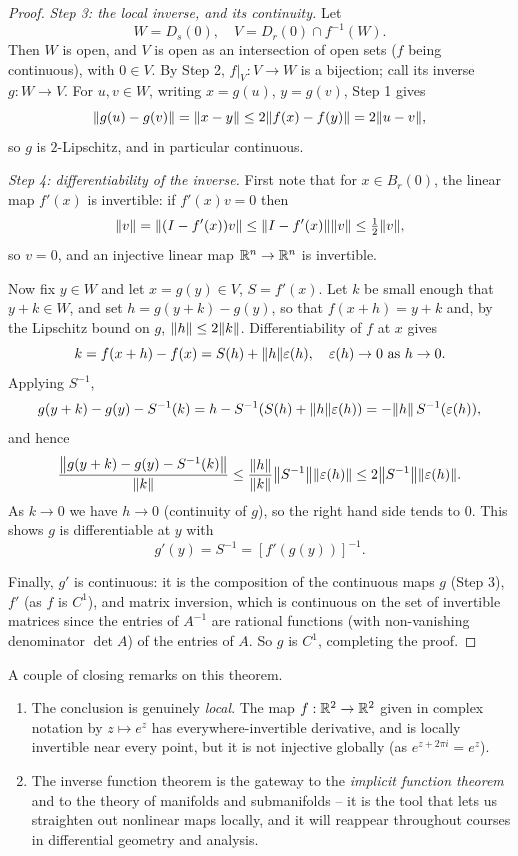 \documentclass[a4paper]{scrartcl}
\begin{document}
\begin{proof}
    \emph{Step 3: the local inverse, and its continuity.} Let
    $$
    W = D_s(0), \quad V = D_r(0) \cap f^{-1}(W).
    $$
    Then $W$ is open, and $V$ is open as an intersection of open sets ($f$ being continuous), with $0 \in V$. By Step 2, $f|_V: V \rightarrow W$ is a bijection; call its inverse $g: W \rightarrow V$. For $u, v \in W$, writing $x = g(u)$, $y = g(v)$, Step 1 gives
    $$
    \norm{g(u) - g(v)} = \norm{x - y} \leq 2\norm{f(x) - f(y)} = 2\norm{u - v},
    $$
    so $g$ is $2$-Lipschitz, and in particular continuous.

    \emph{Step 4: differentiability of the inverse.} First note that for $x \in B_r(0)$, the linear map $f'(x)$ is invertible: if $f'(x)v = 0$ then
    $$
    \norm{v} = \norm{(I - f'(x))v} \leq \norm{I - f'(x)}\norm{v} \leq \tfrac{1}{2}\norm{v},
    $$
    so $v = 0$, and an injective linear map $\mathbb{R}^n \rightarrow \mathbb{R}^n$ is invertible.

    Now fix $y \in W$ and let $x = g(y) \in V$, $S = f'(x)$. Let $k$ be small enough that $y + k \in W$, and set $h = g(y + k) - g(y)$, so that $f(x + h) = y + k$ and, by the Lipschitz bound on $g$, $\norm{h} \leq 2\norm{k}$. Differentiability of $f$ at $x$ gives
    $$
    k = f(x + h) - f(x) = S(h) + \norm{h}\varepsilon(h), \quad \varepsilon(h) \rightarrow 0 \text{ as } h \rightarrow 0.
    $$
    Applying $S^{-1}$,
    $$
    g(y + k) - g(y) - S^{-1}(k) = h - S^{-1}(S(h) + \norm{h}\varepsilon(h)) = -\norm{h}\, S^{-1}(\varepsilon(h)),
    $$
    and hence
    $$
    \frac{\norm{g(y + k) - g(y) - S^{-1}(k)}}{\norm{k}} \leq \frac{\norm{h}}{\norm{k}}\norm{S^{-1}}\norm{\varepsilon(h)} \leq 2\norm{S^{-1}}\norm{\varepsilon(h)}.
    $$
    As $k \rightarrow 0$ we have $h \rightarrow 0$ (continuity of $g$), so the right hand side tends to $0$. This shows $g$ is differentiable at $y$ with
    $$
    g'(y) = S^{-1} = \left[f'(g(y))\right]^{-1}.
    $$

    Finally, $g'$ is continuous: it is the composition of the continuous maps $g$ (Step 3), $f'$ (as $f$ is $C^1$), and matrix inversion, which is continuous on the set of invertible matrices since the entries of $A^{-1}$ are rational functions (with non-vanishing denominator $\det A$) of the entries of $A$. So $g$ is $C^1$, completing the proof.
\end{proof}

\begin{remark}
    A couple of closing remarks on this theorem.
    \begin{enumerate}[label=(\roman*)]
        \item The conclusion is genuinely \emph{local}. The map $f: \mathbb{R}^2 \rightarrow \mathbb{R}^2$ given in complex notation by $z \mapsto e^z$ has everywhere-invertible derivative, and is locally invertible near every point, but it is not injective globally (as $e^{z + 2\pi i} = e^z$).
        \item The inverse function theorem is the gateway to the \emph{implicit function theorem} and to the theory of manifolds and submanifolds -- it is the tool that lets us straighten out nonlinear maps locally, and it will reappear throughout courses in differential geometry and analysis.
    \end{enumerate}
\end{remark}
\end{document}
